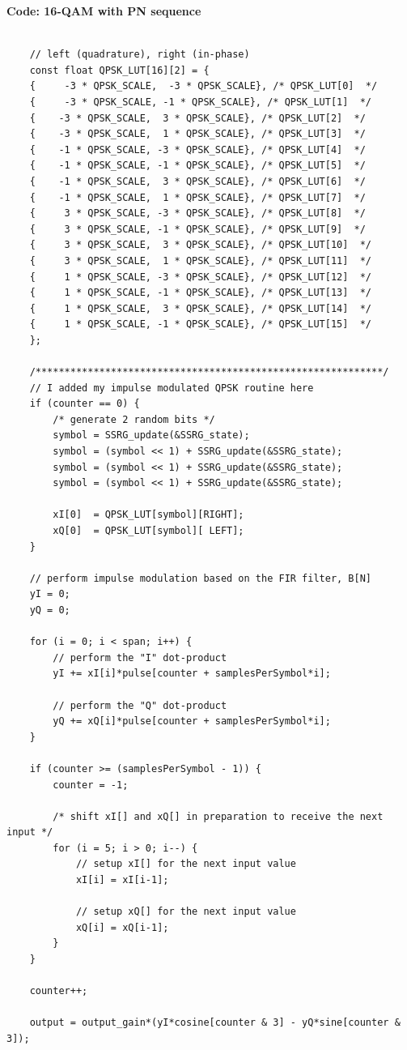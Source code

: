 \documentclass{article}
\begin{document}
\textbf{Code: 16-QAM with PN sequence}

\begin{verbatim}

	// left (quadrature), right (in-phase)
	const float QPSK_LUT[16][2] = {
	{     -3 * QPSK_SCALE,  -3 * QPSK_SCALE}, /* QPSK_LUT[0]  */
	{     -3 * QPSK_SCALE, -1 * QPSK_SCALE}, /* QPSK_LUT[1]  */
	{    -3 * QPSK_SCALE,  3 * QPSK_SCALE}, /* QPSK_LUT[2]  */
	{    -3 * QPSK_SCALE,  1 * QPSK_SCALE}, /* QPSK_LUT[3]  */
	{    -1 * QPSK_SCALE, -3 * QPSK_SCALE}, /* QPSK_LUT[4]  */
	{    -1 * QPSK_SCALE, -1 * QPSK_SCALE}, /* QPSK_LUT[5]  */
	{    -1 * QPSK_SCALE,  3 * QPSK_SCALE}, /* QPSK_LUT[6]  */
	{    -1 * QPSK_SCALE,  1 * QPSK_SCALE}, /* QPSK_LUT[7]  */
	{     3 * QPSK_SCALE, -3 * QPSK_SCALE}, /* QPSK_LUT[8]  */
	{     3 * QPSK_SCALE, -1 * QPSK_SCALE}, /* QPSK_LUT[9]  */
	{     3 * QPSK_SCALE,  3 * QPSK_SCALE}, /* QPSK_LUT[10]  */
	{     3 * QPSK_SCALE,  1 * QPSK_SCALE}, /* QPSK_LUT[11]  */
	{     1 * QPSK_SCALE, -3 * QPSK_SCALE}, /* QPSK_LUT[12]  */
	{     1 * QPSK_SCALE, -1 * QPSK_SCALE}, /* QPSK_LUT[13]  */
	{     1 * QPSK_SCALE,  3 * QPSK_SCALE}, /* QPSK_LUT[14]  */
	{     1 * QPSK_SCALE, -1 * QPSK_SCALE}, /* QPSK_LUT[15]  */
	};

	/************************************************************/
	// I added my impulse modulated QPSK routine here
	if (counter == 0) {
		/* generate 2 random bits */
		symbol = SSRG_update(&SSRG_state); 
		symbol = (symbol << 1) + SSRG_update(&SSRG_state);
		symbol = (symbol << 1) + SSRG_update(&SSRG_state);
		symbol = (symbol << 1) + SSRG_update(&SSRG_state);

		xI[0]  = QPSK_LUT[symbol][RIGHT];  
		xQ[0]  = QPSK_LUT[symbol][ LEFT];   
	}

	// perform impulse modulation based on the FIR filter, B[N]
	yI = 0;
	yQ = 0;

	for (i = 0; i < span; i++) {
		// perform the "I" dot-product
		yI += xI[i]*pulse[counter + samplesPerSymbol*i];	

		// perform the "Q" dot-product
		yQ += xQ[i]*pulse[counter + samplesPerSymbol*i];	
	}

	if (counter >= (samplesPerSymbol - 1)) {
		counter = -1; 

		/* shift xI[] and xQ[] in preparation to receive the next input */
		for (i = 5; i > 0; i--) {
			// setup xI[] for the next input value
			xI[i] = xI[i-1];  

			// setup xQ[] for the next input value
			xQ[i] = xQ[i-1];  
		}
	}

	counter++;

	output = output_gain*(yI*cosine[counter & 3] - yQ*sine[counter & 3]);
\end{verbatim}
\end{document}
